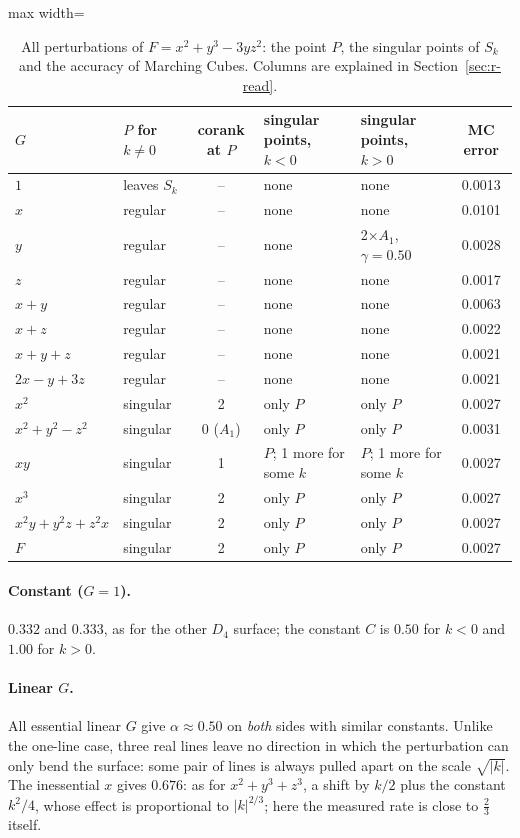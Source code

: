 \documentclass[12pt, a4paper]{article}
\theoremstyle{plain}
\theoremstyle{definition}
\theoremstyle{remark}
\theoremstyle{definition}
\begin{document}
\begin{table}[!h]
\centering
\footnotesize
\begin{adjustbox}{max width=\textwidth}
\begin{tabular}{l l c l l c}
\toprule
$G$ & $P$ for $k\neq0$ & corank at $P$ & singular points, $k<0$ & singular points, $k>0$ & MC error \\
\midrule
$1$ & leaves $S_k$ & -- & none & none & 0.0013 \\
$x$ & regular & -- & none & none & 0.0101 \\
$y$ & regular & -- & none & 2$\times$$A_1$, $\gamma=0.50$ & 0.0028 \\
$z$ & regular & -- & none & none & 0.0017 \\
$x+y$ & regular & -- & none & none & 0.0063 \\
$x+z$ & regular & -- & none & none & 0.0022 \\
$x+y+z$ & regular & -- & none & none & 0.0021 \\
$2x-y+3z$ & regular & -- & none & none & 0.0021 \\
$x^2$ & singular & 2 & only $P$ & only $P$ & 0.0027 \\
$x^2+y^2-z^2$ & singular & 0 ($A_1$) & only $P$ & only $P$ & 0.0031 \\
$xy$ & singular & 1 & $P$; 1 more for some $k$ & $P$; 1 more for some $k$ & 0.0027 \\
$x^3$ & singular & 2 & only $P$ & only $P$ & 0.0027 \\
$x^2y+y^2z+z^2x$ & singular & 2 & only $P$ & only $P$ & 0.0027 \\
$F$ & singular & 2 & only $P$ & only $P$ & 0.0027 \\
\bottomrule
\end{tabular}
\end{adjustbox}
\caption[Singular points for $x^2+y^3-3yz^2$]{All perturbations of $F=x^2+y^3-3yz^2$: the point $P$, the singular points of $S_k$ and the accuracy of Marching Cubes. Columns are explained in Section~\ref{sec:r-read}.}
\label{tab:r-D4b-points}
\end{table}
\paragraph{Constant ($G=1$).} $0.332$ and $0.333$, as for the other $D_4$ surface;
the constant $C$ is $0.50$ for $k<0$ and $1.00$ for $k>0$.

\paragraph{Linear $G$.} All essential linear $G$ give $\alpha\approx0.50$ on
\emph{both} sides with similar constants. Unlike the one-line case, three real lines
leave no direction in which the perturbation can only bend the surface: some pair
of lines is always pulled apart on the scale $\sqrt{|k|}$. The inessential $x$ gives
$0.676$: as for $x^2+y^3+z^3$, a shift by $k/2$ plus the constant $k^2/4$, whose
effect is proportional to $|k|^{2/3}$; here the measured rate is close to $\tfrac23$
itself.
\end{document}
